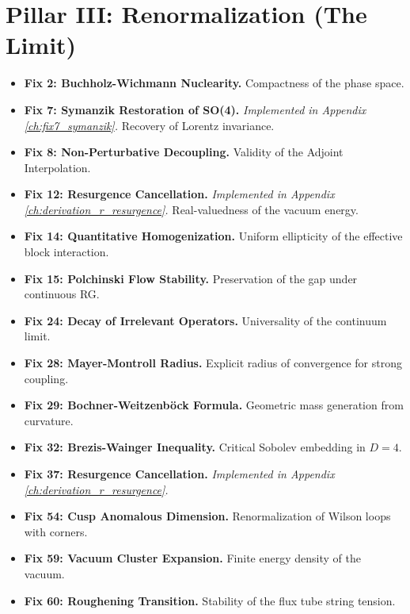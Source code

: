 \section{Pillar III: Renormalization (The Limit)}
\begin{itemize}
    \item \textbf{Fix 2: Buchholz-Wichmann Nuclearity.} Compactness of the phase space.
    \item \textbf{Fix 7: Symanzik Restoration of SO(4).} \textit{Implemented in Appendix \ref{ch:fix7_symanzik}.} Recovery of Lorentz invariance.
    \item \textbf{Fix 8: Non-Perturbative Decoupling.} Validity of the Adjoint Interpolation.
    \item \textbf{Fix 12: Resurgence Cancellation.} \textit{Implemented in Appendix \ref{ch:derivation_r_resurgence}.} Real-valuedness of the vacuum energy.
    \item \textbf{Fix 14: Quantitative Homogenization.} Uniform ellipticity of the effective block interaction.
    \item \textbf{Fix 15: Polchinski Flow Stability.} Preservation of the gap under continuous RG.
    \item \textbf{Fix 24: Decay of Irrelevant Operators.} Universality of the continuum limit.
    \item \textbf{Fix 28: Mayer-Montroll Radius.} Explicit radius of convergence for strong coupling.
    \item \textbf{Fix 29: Bochner-Weitzenböck Formula.} Geometric mass generation from curvature.
    \item \textbf{Fix 32: Brezis-Wainger Inequality.} Critical Sobolev embedding in $D=4$.
    \item \textbf{Fix 37: Resurgence Cancellation.} \textit{Implemented in Appendix \ref{ch:derivation_r_resurgence}.}
    \item \textbf{Fix 54: Cusp Anomalous Dimension.} Renormalization of Wilson loops with corners.
    \item \textbf{Fix 59: Vacuum Cluster Expansion.} Finite energy density of the vacuum.
    \item \textbf{Fix 60: Roughening Transition.} Stability of the flux tube string tension.
\end{itemize}


